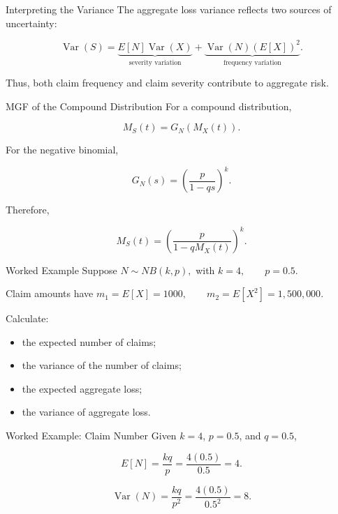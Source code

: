 \documentclass[
  ignorenonframetext,
  aspectratio=169,
]{beamer}
\providecommand{\tightlist}{%
  \setlength{\itemsep}{0pt}\setlength{\parskip}{0pt}}
\begin{document}
\begin{frame}{Interpreting the Variance}
\protect{}\label{interpreting-the-variance}
The aggregate loss variance reflects two sources of uncertainty:

\[
\operatorname{Var}(S)
=
\underbrace{E[N]\operatorname{Var}(X)}
_{\text{severity variation}}
+
\underbrace{\operatorname{Var}(N)(E[X])^2}
_{\text{frequency variation}}.
\]

Thus, both claim frequency and claim severity contribute to aggregate
risk.
\end{frame}

\begin{frame}{MGF of the Compound Distribution}
\protect{}\label{mgf-of-the-compound-distribution}
For a compound distribution,

\[
M_S(t)=G_N(M_X(t)).
\]

For the negative binomial,

\[
G_N(s)
=
\left(\frac{p}{1-qs}\right)^k.
\]

Therefore,

\[
\boxed{
M_S(t)
=
\left(
\frac{p}{1-qM_X(t)}
\right)^k
}.
\]
\end{frame}

\begin{frame}{Worked Example}
\protect{}\label{worked-example}
Suppose \(N\sim NB(k,p),\) with \(k=4,\qquad p=0.5.\)

Claim amounts have \(m_1=E[X]=1000,\qquad m_2=E[X^2]=1{,}500{,}000.\)

Calculate:

\begin{itemize}
\tightlist
\item
  the expected number of claims;
\item
  the variance of the number of claims;
\item
  the expected aggregate loss;
\item
  the variance of aggregate loss.
\end{itemize}
\end{frame}

\begin{frame}{Worked Example: Claim Number}
\protect{}\label{worked-example-claim-number}
Given \(k=4\), \(p=0.5\), and \(q=0.5\),

\[
E[N]=\frac{kq}{p}
=\frac{4(0.5)}{0.5}=4.
\]

\[
\operatorname{Var}(N)
=\frac{kq}{p^2}
=\frac{4(0.5)}{0.5^2}=8.
\]
\end{frame}
\end{document}

